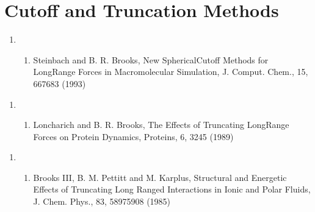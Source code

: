 \documentclass[letterpaper,11pt,english]{sphinxmanual}
\begin{document}
\section{Cutoff and Truncation Methods}
\label{\detokenize{text/references:cutoff-and-truncation-methods}}\begin{enumerate}
%
\setcounter{enumi}{15}
\item {} \begin{enumerate}
%
\setcounter{enumii}{9}
\item {} 
Steinbach and B. R. Brooks, New Spherical\sphinxhyphen{}Cutoff Methods for Long\sphinxhyphen{}Range Forces in Macromolecular Simulation, J. Comput. Chem., 15, 667\sphinxhyphen{}683 (1993)

\end{enumerate}

\end{enumerate}
\begin{enumerate}
%
\setcounter{enumi}{17}
\item {} \begin{enumerate}
%
\setcounter{enumii}{9}
\item {} 
Loncharich and B. R. Brooks, The Effects of Truncating Long\sphinxhyphen{}Range Forces on Protein Dynamics, Proteins, 6, 32\sphinxhyphen{}45 (1989)

\end{enumerate}

\end{enumerate}
\begin{enumerate}
%
\setcounter{enumi}{2}
\item {} \begin{enumerate}
%
\setcounter{enumii}{11}
\item {} 
Brooks III, B. M. Pettitt and M. Karplus, Structural and Energetic Effects of Truncating Long Ranged Interactions in Ionic and Polar Fluids, J. Chem. Phys., 83, 5897\sphinxhyphen{}5908 (1985)

\end{enumerate}

\end{enumerate}
\end{document}
